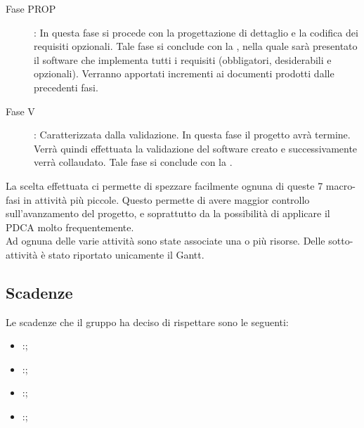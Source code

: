\begin{description}
			\item[Fase PROP]: In questa fase si procede con la progettazione di dettaglio e la codifica dei requisiti opzionali. Tale fase si conclude con la , nella quale sarà presentato il software che implementa tutti i requisiti (obbligatori, desiderabili e opzionali). Verranno apportati incrementi ai documenti prodotti dalle precedenti fasi.
			\item[Fase V]: Caratterizzata dalla validazione. In questa fase il progetto avrà termine. Verrà quindi effettuata la validazione del software creato e successivamente verrà collaudato. Tale fase si conclude con la .
		\end{description}
		La scelta effettuata ci permette di spezzare facilmente ognuna di queste 7 macro-fasi in attività più piccole. Questo permette di avere maggior controllo sull'avanzamento del progetto, e soprattutto da la possibilità di applicare il PDCA molto frequentemente.\\Ad ognuna delle varie attività sono state associate una o più risorse. Delle sotto-attività è stato riportato unicamente il Gantt.
	\subsection{Scadenze}
		Le scadenze che il gruppo \groupname ha deciso di rispettare sono le seguenti:
		\begin{itemize}
			\item {}:;
			\item {}:;
			\item {}:;
			\item {}:;
		\end{itemize}